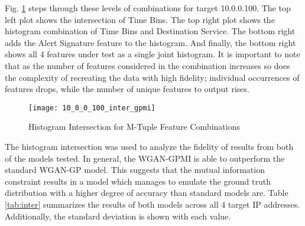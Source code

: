 Fig. \ref{fig:inter} steps through these levels of combinations for target 10.0.0.100. The top left plot shows the intersection of Time Bins. The top right plot shows the histogram combination of Time Bins and Destination Service. The bottom right adds the Alert Signature feature to the histogram. And finally, the bottom right shows all 4 features under test as a single joint histogram. It is important to note that as the number of features considered in the combination increases so does the complexity of recreating the data with high fidelity; individual occurrences of features drops, while the number of unique features to output rises.


\begin{figure}[!htbp]
	\centering
	\texttt{[image: 10\_0\_0\_100\_inter\_gpmi]}
	\caption{
		Histogram Intersection for M-Tuple Feature Combinations
	}
	\label{fig:inter}
\end{figure}

The histogram intersection was used to analyze the fidelity of results from both of the models tested. In general, the WGAN-GPMI is able to outperform the standard WGAN-GP model. This suggests that the mutual information constraint results in a model which manages to emulate the ground truth distribution with a higher degree of accuracy than standard models are. Table \ref{tab:inter} summarizes the results of both models across all 4 target IP addresses. Additionally, the standard deviation is shown with each value.

